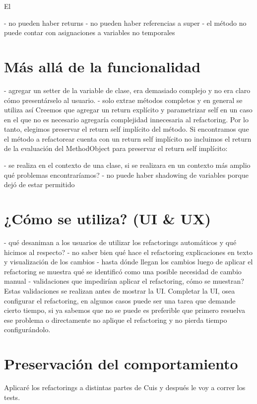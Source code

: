 El 




- no pueden haber returns
- no pueden haber referencias a super
- el método no puede contar con asignaciones a variables no temporales

\section{Más allá de la funcionalidad}
- agregar un setter de la variable de clase, era demasiado complejo y no era claro cómo presentárselo al usuario.
- solo extrae métodos completos y en general se utiliza así
Creemos que agregar un return explícito y parametrizar self en un caso en el que no es necesario
agregaría complejidad innecesaria al refactoring. Por lo tanto, elegimos preservar el return self
implícito del método. Si encontramos que el método a refactorear cuenta con un return self implícito
no incluimos el return de la evaluación del MethodObject para preservar el return self implícito:

- se realiza en el contexto de una clase, si se realizara en un contexto más amplio qué problemas encontraríamos?
- no puede haber shadowing de variables porque dejó de estar permitido

\section{¿Cómo se utiliza? (UI & UX)}
- qué desaniman a los usuarios de utilizar los refactorings automáticos y qué hicimos al respecto?
    - no saber bien qué hace el refactoring
    explicaciones en texto y visualización de los cambios
    - hasta dónde llegan los cambios
    luego de aplicar el refactoring se muestra qué se identificó como una posible necesidad de cambio manual
- validaciones que impedirían aplicar el refactoring, cómo se muestran? Estas validaciones se
realizan antes de mostrar la UI. Completar la UI, osea configurar el refactoring, en algunos
casos puede ser una tarea que demande cierto tiempo, si ya sabemos que no se puede es preferible
que primero resuelva ese problema o directamente no aplique el refactoring y no pierda tiempo
configurándolo.


\section{Preservación del comportamiento}
Aplicaré los refactorings a distintas partes de Cuis y después le voy a correr los tests.